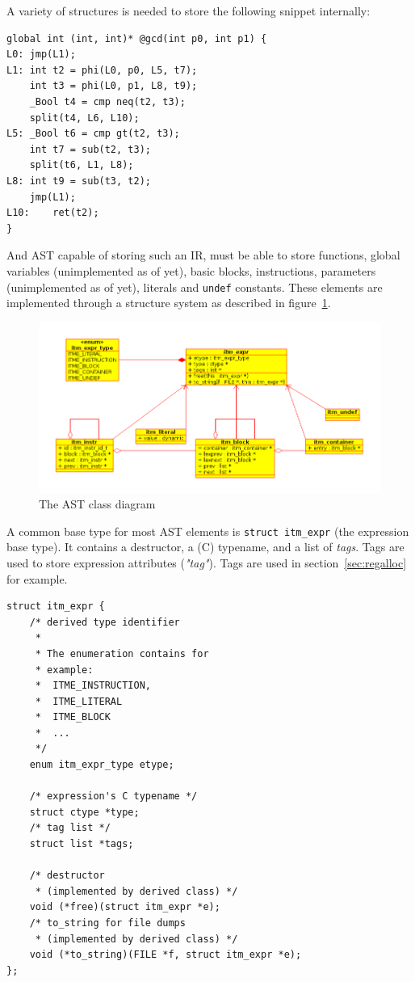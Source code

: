 \documentclass[12pt, a4paper]{article}
\begin{document}
A variety of structures is needed to store the following snippet internally:

\begin{lstlisting}
global int (int, int)* @gcd(int p0, int p1) {
L0:	jmp(L1);
L1:	int t2 = phi(L0, p0, L5, t7);
	int t3 = phi(L0, p1, L8, t9);
	_Bool t4 = cmp neq(t2, t3);
	split(t4, L6, L10);
L5:	_Bool t6 = cmp gt(t2, t3);
	int t7 = sub(t2, t3);
	split(t6, L1, L8);
L8:	int t9 = sub(t3, t2);
	jmp(L1);
L10:	ret(t2);
}
\end{lstlisting}

And AST capable of storing such an IR, must be able to store functions, global
variables (unimplemented as of yet), basic blocks, instructions, parameters
(unimplemented as of yet), literals and \verb+undef+ constants. These elements
are implemented through a structure system as described in figure~\ref{fig:ast}.

\begin{figure}[h]
\begin{center}
\includegraphics[resolution=150]{ast.png}
\caption{The AST class diagram}
\label{fig:ast}
\end{center}
\end{figure}

A common base type for most AST elements is \verb+struct itm_expr+ (the
expression base type). It contains a destructor, a (C) typename, and a list of
\textit{tags}. Tags are used to store expression attributes (\textit{"tag"}).
Tags are used in section~\ref{sec:regalloc} for example.

\begin{lstlisting}
struct itm_expr {
	/* derived type identifier
	 *
	 * The enumeration contains for
	 * example:
	 *  ITME_INSTRUCTION,
	 *  ITME_LITERAL
	 *  ITME_BLOCK
	 *  ...
	 */
	enum itm_expr_type etype;

	/* expression's C typename */
	struct ctype *type;
	/* tag list */
	struct list *tags;

	/* destructor
	 * (implemented by derived class) */
	void (*free)(struct itm_expr *e);
	/* to_string for file dumps
	 * (implemented by derived class) */
	void (*to_string)(FILE *f, struct itm_expr *e);
};
\end{lstlisting}
\end{document}
